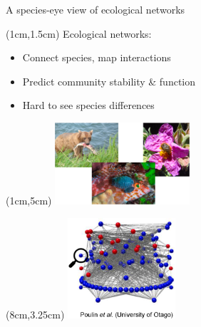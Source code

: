 \documentclass{beamer}
\begin{document}


    \begin{frame}{A species-eye view of ecological networks}
      \begin{textblock*}{10cm}(1cm,1.5cm)
        Ecological networks:
        \begin{itemize}
          \item Connect species, map interactions
          \item Predict community stability \& function
          \item Hard to see species differences
        \end{itemize}
        \end{textblock*}
      \begin{textblock*}{5cm}(1cm,5cm)
        \includegraphics[width=5cm]{intro_figs/interaction_examples.eps}
        \end{textblock*}
      \begin{textblock*}{5cm}(8cm,3.25cm)
        \includegraphics[width=4cm]{intro_figs/Otagoweb_closeup.eps}
        \end{textblock*}    
      \end{frame}
\end{document}
